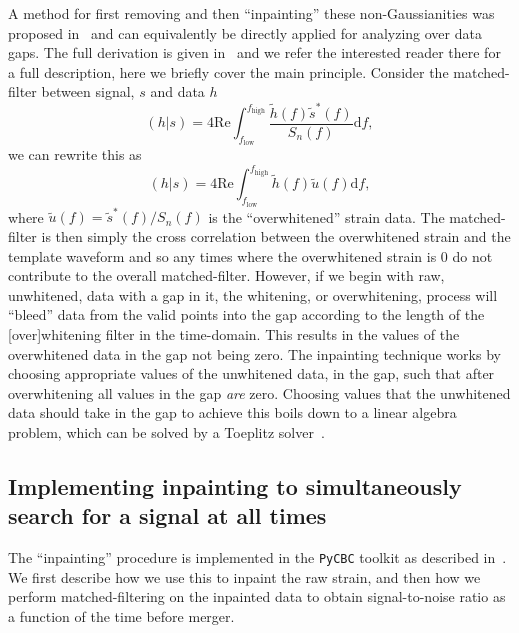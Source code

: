 \documentclass[%
 reprint,
superscriptaddress,
 nofootinbib,
 amsmath,amssymb,
 aps,
 prd,
]{revtex4-2}
\begin{document}
A method for first removing and then ``inpainting'' these non-Gaussianities was proposed in~\cite{Zackay:2019kkv} and can equivalently be directly applied for analyzing over data gaps.
The full derivation is given in~\cite{Zackay:2019kkv,Capano:2021etf} and we refer the interested reader there for a full description, here we briefly cover the main principle.
Consider the matched-filter between signal, $s$ and data $h$
%
\begin{equation}
    (h|s) = 4\mathrm{Re}\int_{f_\mathrm{low}}^{f_\mathrm{high}}\frac{\tilde{h}(f)\tilde{s}^*(f)}{S_n(f)} \mathrm{d} f,
\end{equation}
%
we can rewrite this as
%
\begin{equation}
    (h|s) = 4\mathrm{Re}\int_{f_\mathrm{low}}^{f_\mathrm{high}} \tilde{h}(f) \tilde{u}(f)  \mathrm{d} f,
\end{equation}
%
where $\tilde{u}(f) = \tilde{s}^*(f) / S_n(f)$ is the ``overwhitened'' strain data.
The matched-filter is then simply the cross correlation between the overwhitened strain and the template waveform and so any times where the overwhitened strain is 0 do not contribute to the overall matched-filter.
However, if we begin with raw, unwhitened, data with a gap in it, the whitening, or overwhitening, process will ``bleed'' data from the valid points into the gap according to the length of the [over]whitening filter in the time-domain.
This results in the values of the overwhitened data in the gap not being zero.
The inpainting technique works by choosing appropriate values of the unwhitened data, in the gap, such that after overwhitening all values in the gap \emph{are} zero.
Choosing values that the unwhitened data should take in the gap to achieve this boils down to a linear algebra problem, which can be solved by a Toeplitz solver~\cite{Zackay:2019kkv}.

\subsection{Implementing inpainting to simultaneously search for a signal at all times}

The ``inpainting'' procedure is implemented in the \texttt{PyCBC} toolkit as described in~\cite{Capano:2021etf}.
We first describe how we use this to inpaint the raw strain, and then how we perform matched-filtering on the inpainted data to obtain signal-to-noise ratio as a function of the time before merger.
\end{document}
